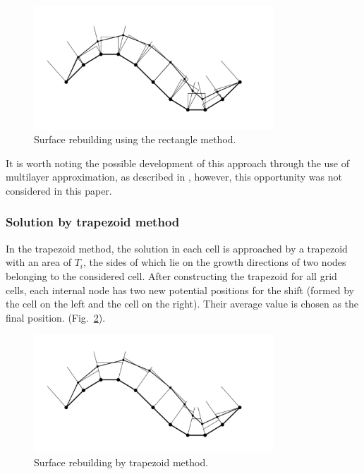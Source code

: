 \begin{figure}[h]
\onelinecaptionstrue
\centering
\includegraphics[width=0.8\textwidth]{pics/text_1_remesh_2d/grid_rectangles.pdf}
\caption{Surface rebuilding using the rectangle method.}
\label{fig:grid_rectangles}
\end{figure}

It is worth noting the possible development of this approach through the use of multilayer approximation, as described in \cite{Bourgault_Cote}, however, this opportunity was not considered in this paper.

\subsubsection{Solution by trapezoid method}

In the trapezoid method, the solution in each cell is approached by a trapezoid with an area of $T_i$, the sides of which lie on the growth directions of two nodes belonging to the considered cell.
After constructing the trapezoid for all grid cells, each internal node has two new potential positions for the shift (formed by the cell on the left and the cell on the right).
Their average value is chosen as the final position. (Fig.~\ref{fig:grid_trapeziums}).

\begin{figure}[h]
\onelinecaptionstrue
\centering
\includegraphics[width=0.8\textwidth]{pics/text_1_remesh_2d/grid_trapeziums.pdf}
\caption{Surface rebuilding by trapezoid method.}
\label{fig:grid_trapeziums}
\end{figure}

